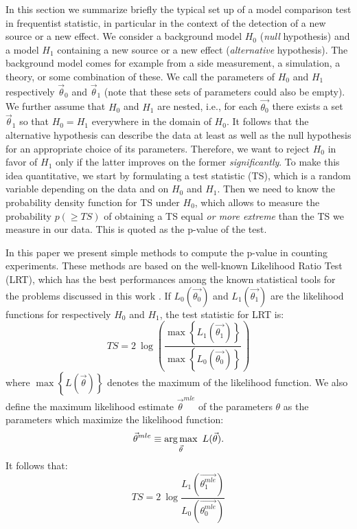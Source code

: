 \documentclass[twocolumn]{aastex61}
\newcommand{\argmax}{\operatornamewithlimits{arg\,max}}
\begin{document}
In this section we summarize briefly the typical set up of a model comparison test in frequentist statistic, in particular in the context of the detection of a new source or a new effect. We consider a background model $H_{0}$ (\textit{null} hypothesis) and a model $H_{1}$ containing a new source or a new effect (\textit{alternative} hypothesis). The background model comes for example from a side measurement, a simulation, a theory, or some combination of these. We call the parameters of $H_{0}$ and $H_{1}$ respectively $\vec{\theta}_{0}$ and $\vec{\theta}_{1}$ (note that these sets of parameters could also be empty). We further assume that $H_{0}$ and $H_{1}$ are nested, i.e., for each $\vec{\theta_{0}}$ there exists a set $\vec{\theta}_{1}$ so that $H_{0} = H_{1}$ everywhere in the domain of $H_{0}$. It follows that the alternative hypothesis can describe the data at least as well as the null hypothesis for an appropriate choice of its parameters. Therefore, we want to reject $H_{0}$ in favor of $H_{1}$ only if the latter improves on the former \textit{significantly}. To make this idea quantitative, we start by formulating a test statistic (TS), which is a random variable depending on the data and on $H_{0}$ and $H_{1}$. Then we need to know the probability density function for TS under $H_{0}$, which allows to measure the probability $p(\geq TS)$ of obtaining a TS equal \textit{or more extreme} than the TS we measure in our data. This is quoted as the p-value of the test.

In this paper we present simple methods to compute the p-value in counting experiments. These methods are based on the well-known Likelihood Ratio Test (LRT), which has the best performances among the known statistical tools for the problems discussed in this work \citet{Cousins2008}. If $L_{0}(\vec{\theta_{0}})$ and $L_{1}(\vec{\theta_{1}})$ are the likelihood functions for respectively $H_{0}$ and $H_{1}$, the test statistic for LRT is:
$$
TS = 2~\log{ \left( \frac{ \max{\left\{ L_{1}(\vec{\theta_1}) \right\}} }{ \max{\left\{ 
L_{0}(\vec{\theta_0}) \right\}} } \right) }
$$
where $\max{\left\{L(\vec{\theta})\right\}}$ denotes the maximum of the likelihood function. 
We also define the maximum likelihood estimate $\vec{\theta}^{mle}$ of the parameters $\theta$ as 
the parameters which maximize the likelihood function:
$$
\vec{\theta}^{mle} \equiv \argmax_{\vec{\theta}}~L(\vec{\theta}).
$$
It follows that:
\begin{equation}
TS = 2~\log{ \frac{ L_{1}(\vec{\theta_1^{mle}}) }{ L_{0}(\vec{\theta_0^{mle}}) } }
\label{eq:TS_definition}
\end{equation}
\end{document}
